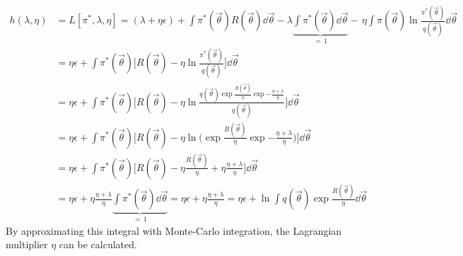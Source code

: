 				\begin{align*}
					h(\lambda, \eta)
					 & = L[\pi^\ast, \lambda, \eta]
					= (\lambda + \eta\epsilon)
					+ \int\! \pi^\ast(\vec{\theta}) R(\vec{\theta}) \dd{\vec{\theta}}
					- \lambda \underbrace{\int\! \pi^\ast(\vec{\theta}) \dd{\vec{\theta}}}_{=\, 1}
					- \,\eta \int\! \pi(\vec{\theta}) \ln \frac{\pi^\ast(\vec{\theta})}{q(\vec{\theta})} \dd{\vec{\theta}}                                                                                                                     \\
					 & = \eta\epsilon + \int\! \pi^\ast(\vec{\theta}) \bigg[ R(\vec{\theta}) - \eta \ln \frac{\pi^\ast(\vec{\theta})}{q(\vec{\theta})} \bigg] \dd{\vec{\theta}}                                                                \\
					 & = \eta\epsilon + \int\! \pi^\ast(\vec{\theta}) \bigg[ R(\vec{\theta}) - \eta \ln \frac{q(\vec{\theta}) \exp{\frac{R(\vec{\theta})}{\eta}} \exp{-\frac{\eta + \lambda}{\eta}}}{q(\vec{\theta})} \bigg] \dd{\vec{\theta}} \\
					 & = \eta\epsilon + \int\! \pi^\ast(\vec{\theta}) \bigg[ R(\vec{\theta}) - \eta \ln \bigg(\!\! \exp{\frac{R(\vec{\theta})}{\eta}} \exp{-\frac{\eta + \lambda}{\eta}} \!\bigg) \bigg] \dd{\vec{\theta}}                     \\
					 & = \eta\epsilon + \int\! \pi^\ast(\vec{\theta}) \bigg[ R(\vec{\theta}) - \eta \frac{R(\vec{\theta})}{\eta} + \eta \frac{\eta + \lambda}{\eta} \bigg] \dd{\vec{\theta}}                                                   \\
					 & = \eta\epsilon + \eta \frac{\eta + \lambda}{\eta} \underbrace{\int\! \pi^\ast(\vec{\theta}) \dd{\vec{\theta}}}_{=\, 1}
					= \eta\epsilon + \eta \frac{\eta + \lambda}{\eta}
					= \eta\epsilon + \ln \int\! q(\vec{\theta}) \exp{\frac{R(\vec{\theta})}{\eta}} \dd{\vec{\theta}}
				\end{align*}
				By approximating this integral with Monte-Carlo integration, the Lagrangian multiplier \(\eta\) can be calculated.

